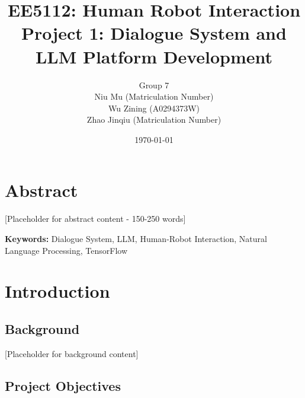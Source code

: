 \documentclass[12pt,a4paper]{article}
\title{\textbf{EE5112: Human Robot Interaction\\Project 1: Dialogue System and LLM Platform Development}}
\author{Group 7\\
Niu Mu (Matriculation Number)\\
Wu Zining (A0294373W)\\
Zhao Jinqiu (Matriculation Number)}
\date{\today}
\begin{document}

\maketitle


\newpage

\tableofcontents

\newpage


\section{Abstract}


[Placeholder for abstract content - 150-250 words]

\textbf{Keywords:} Dialogue System, LLM, Human-Robot Interaction, Natural Language Processing, TensorFlow

\section{Introduction}


\subsection{Background}


[Placeholder for background content]

\subsection{Project Objectives}

\end{document}
